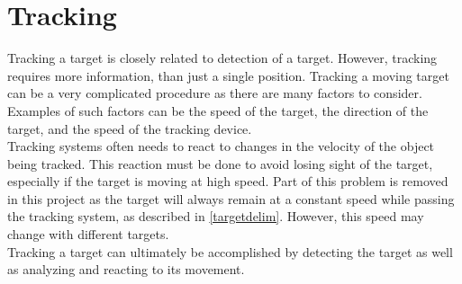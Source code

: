\section{Tracking}\label{sec:tracking}
Tracking a target is closely related to detection of a target. However, tracking requires more information, than just a single position. Tracking a moving target can be a very complicated procedure as there are many factors to consider. Examples of such factors can be the speed of the target, the direction of the target, and the speed of the tracking device.\\

Tracking systems often needs to react to changes in the velocity of the object being tracked. This reaction must be done to avoid losing sight of the target, especially if the target is moving at high speed. Part of this problem is removed in this project as the target will always remain at a constant speed while passing the tracking system, as described in \cref{targetdelim}. However, this speed may change with different targets. \\

Tracking a target can ultimately be accomplished by detecting the target as well as analyzing and reacting to its movement.


